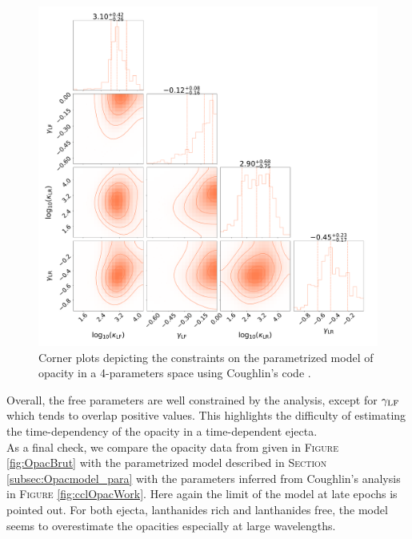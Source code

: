 \documentclass[a4paper, twoside, 11pt]{article}
\numberwithin{equation}{section}
\begin{document}
\begin{figure}[!h]
	\includegraphics[width=\textwidth]{pictures/corner-2.pdf}
\caption[Corner plots for estimation of opacity model parameters ]{Corner plots depicting the constraints on the parametrized model of opacity in a 4-parameters space using Coughlin's code \cite{CoughlinMethod}.}
\label{fig:cornerplot}
\end{figure}

Overall, the  free parameters are well constrained by the analysis, except for $\gamma_{\rm{LF}}$ which tends to overlap positive values. This highlights the difficulty of estimating  the time-dependency of the opacity in a time-dependent ejecta. \\

As a final check, we compare the opacity data from \cite{tanaka} given in F\textsc{igure} \ref{fig:OpacBrut} with the parametrized model described in S\textsc{ection} \ref{subsec:Opacmodel_para} with the parameters inferred from Coughlin's analysis in F\textsc{igure} \ref{fig:cclOpacWork}.   Here again the limit of the model at late epochs is pointed out. For both ejecta, lanthanides rich and lanthanides free, the model seems to overestimate the opacities especially at large wavelengths. 
\end{document}
